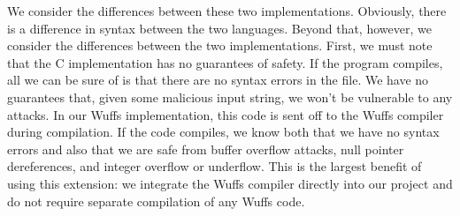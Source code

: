 \documentclass[main.tex]{subfiles}
\begin{document}
We consider the differences between these two implementations. Obviously, there is a difference in syntax
between the two languages. Beyond that, however, we consider the differences between the two implementations.
First, we must note that the C implementation has no guarantees of safety. If the program compiles, all
we can be sure of is that there are no syntax errors in the file. We have no guarantees that, given some malicious
input string, we won't be vulnerable to any attacks. In our Wuffs implementation, this code is sent off to the Wuffs
compiler during compilation. If the code compiles, we know both that we have no syntax errors and also that we are
safe from buffer overflow attacks, null pointer dereferences, and integer overflow or underflow. This is the largest 
benefit of using this extension: we integrate the Wuffs compiler directly into our project and do not require separate 
compilation of any Wuffs code.
\end{document}
